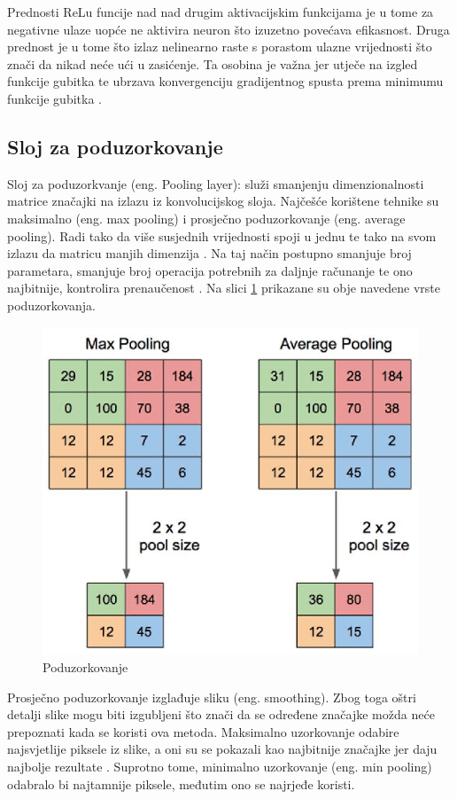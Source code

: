 Prednosti ReLu funcije nad nad drugim aktivacijskim funkcijama je u tome za negativne
ulaze uopće ne aktivira neuron što izuzetno povećava efikasnost. Druga prednost je u tome
što izlaz nelinearno raste s porastom ulazne vrijednosti što znači da nikad neće ući
u zasićenje. Ta osobina je važna jer utječe na izgled funkcije gubitka te ubrzava
konvergenciju gradijentnog spusta prema minimumu funkcije gubitka \cite{activation_fcn}.


\subsection{Sloj za poduzorkovanje}
\label{sub:pooling}
Sloj za poduzorkvanje (eng. Pooling layer): služi smanjenju dimenzionalnosti matrice
značajki na izlazu iz konvolucijskog sloja. Najčešće korištene tehnike su maksimalno 
(eng. max pooling) i prosječno poduzorkovanje (eng. average pooling). Radi tako da više 
susjednih vrijednosti spoji u jednu te tako na svom izlazu da matricu manjih dimenzija 
\cite{pooling1}. Na taj način postupno smanjuje broj parametara, smanjuje broj
operacija potrebnih za daljnje računanje te ono najbitnije, kontrolira
prenaučenost \cite{cnn_whatis}. Na slici \ref{pic:pooling} prikazane su obje navedene vrste poduzorkovanja.

\begin{figure}[htb]
    \centering
    \includegraphics[width=0.5\linewidth]{Chapters/neuronska_mreza/CNN/pooling.png} 
    \caption{Poduzorkovanje \cite{pooling1}}
    \label{pic:pooling}
\end{figure}

Prosječno poduzorkovanje izglađuje sliku (eng. smoothing). Zbog toga oštri detalji slike
mogu biti izgubljeni što znači da se određene značajke možda neće prepoznati kada se 
koristi ova metoda. Maksimalno uzorkovanje odabire najsvjetlije piksele iz slike,
a oni su se pokazali kao najbitnije značajke jer daju najbolje rezultate \cite{cnn_whatis}.
Suprotno tome, minimalno uzorkovanje (eng. min pooling) odabralo bi najtamnije piksele,
međutim ono se najrjeđe koristi.

